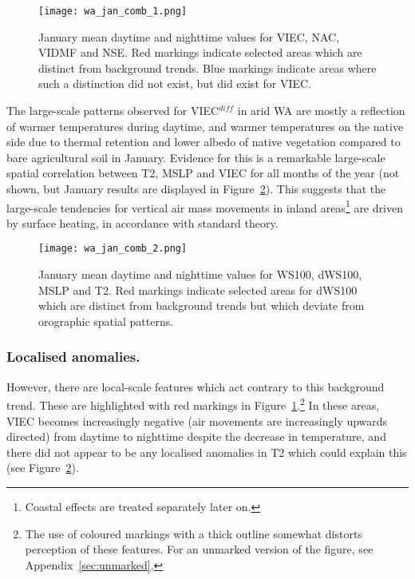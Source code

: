 \begin{figure}[!ht]
	\centering
	\texttt{[image: wa\_jan\_comb\_1.png]}
	\caption[WA January means for selected variables 1]{January mean daytime and nighttime values for \acs{VIEC}, \acs{NAC}, \acs{VIDMF} and \acs{NSE}. Red markings indicate selected areas which are distinct from background trends. Blue markings indicate areas where such a distinction did not exist, but did exist for \acs{VIEC}.}
	\label{fig:wa_jan_comb_1}
\end{figure}

The large-scale patterns observed for \ac{VIEC}$^{diff}$ in arid \ac{WA} are mostly a reflection of warmer temperatures during daytime, and warmer temperatures on the native side due to thermal retention and lower albedo of native vegetation compared to bare agricultural soil in January. Evidence for this is a remarkable large-scale spatial correlation between \ac{T2}, \ac{MSLP} and \ac{VIEC} for all months of the year (not shown, but January results are displayed in Figure~\ref{fig:wa_jan_comb_2}). This suggests that the large-scale tendencies for vertical air mass movements in inland areas\footnote{Coastal effects are treated separately later on.} are driven by surface heating, in accordance with standard theory.

\begin{figure}[!ht]
	\centering
	\texttt{[image: wa\_jan\_comb\_2.png]}
	\caption[WA January means for selected variables 2]{January mean daytime and nighttime values for \acs{WS100}, \acs{dWS100}, \acs{MSLP} and \acs{T2}. Red markings indicate selected areas for \acs{dWS100} which are distinct from background trends but which deviate from orographic spatial patterns.}
	\label{fig:wa_jan_comb_2}
\end{figure}

\subsubsection{Localised anomalies.}

However, there are local-scale features which act contrary to this background trend. These are highlighted with red markings in Figure~\ref{fig:wa_jan_comb_1}.\footnote{The use of coloured markings with a thick outline somewhat distorts perception of these features. For an unmarked version of the figure, see Appendix~\ref{sec:unmarked}.} In these areas, \ac{VIEC} becomes increasingly negative (air movements are increasingly upwards directed) from daytime to nighttime despite the decrease in temperature, and there did not appear to be any localised anomalies in \ac{T2} which could explain this (see Figure~\ref{fig:wa_jan_comb_2}).

